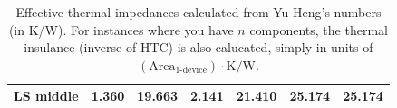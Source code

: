 \begin{table}[h]
\begin{center}
{\begin{tabular}{|l|cc|c|c|c|c|c|c|}
LS middle &   \multicolumn{2}{c|}{1.360} & \multicolumn{2}{c|}{19.663} &         2.141 &    21.410 &         25.174 &    25.174 \\
\hline \end{tabular}
} %
\end{center}
\caption{Effective thermal impedances calculated from Yu-Heng's numbers (in K/W).
For instances where you have $n$ components, the thermal insulance (inverse of HTC) is also calucated, simply
in units of {${(\text{Area}_\text{1-device})\cdot\text{K/W}}$}.
}
\label{tab:thermal_impedances}
\end{table}
\let\arraystretch\arraystretcha
